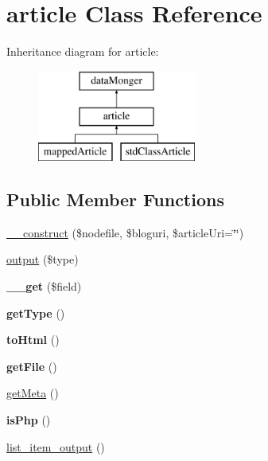 \hypertarget{classarticle}{\section{article Class Reference}
\label{classarticle}
}
Inheritance diagram for article\-:\begin{figure}[H]
\begin{center}
\leavevmode
\includegraphics[height=3.000000cm]{classarticle}
\end{center}
\end{figure}
\subsection*{Public Member Functions}
\begin{DoxyCompactItemize}
\item 
\hyperlink{classarticle_abc0c9463fc62baf5b4ef25b8ce546719}{\-\_\-\-\_\-construct} (\$nodefile, \$bloguri, \$article\-Uri=\char`\"{}\char`\"{})
\item 
\hyperlink{classarticle_a388fbd65b6ac1ab943b57284ce69eb56}{output} (\$type)
\item 
\hypertarget{classarticle_acfe6274b03d0051798d935e45d054195}{{\bfseries \-\_\-\-\_\-get} (\$field)}\label{classarticle_acfe6274b03d0051798d935e45d054195}

\item 
\hypertarget{classarticle_a93fcc436140d32b39762d95475474fb3}{{\bfseries get\-Type} ()}\label{classarticle_a93fcc436140d32b39762d95475474fb3}

\item 
\hypertarget{classarticle_afdda7e69ce8567ac2be12214fec5a852}{{\bfseries to\-Html} ()}\label{classarticle_afdda7e69ce8567ac2be12214fec5a852}

\item 
\hypertarget{classarticle_a2a51edc07f4e8ca22aeec3b997a8dc56}{{\bfseries get\-File} ()}\label{classarticle_a2a51edc07f4e8ca22aeec3b997a8dc56}

\item 
\hyperlink{classarticle_a07b78b42ec5aa8cc3423d758038c69fc}{get\-Meta} ()
\item 
\hypertarget{classarticle_a30c5793bc25061365c8b8a79103012be}{{\bfseries is\-Php} ()}\label{classarticle_a30c5793bc25061365c8b8a79103012be}

\item 
\hyperlink{classarticle_a0fdbe317408cbc7eed6fdbac441bb700}{list\-\_\-item\-\_\-output} ()
\end{DoxyCompactItemize}
